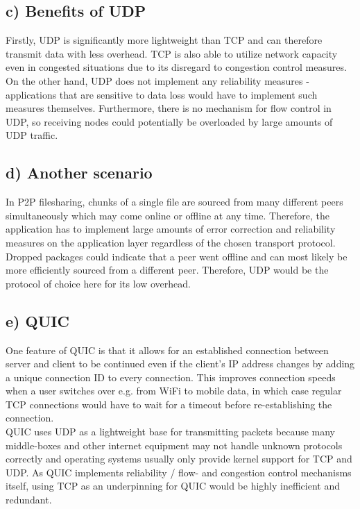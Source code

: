 \documentclass[a4paper, 11 pt, article, accentcolor=tud7b]{tudreport}
\begin{document}
	\subsection*{c) Benefits of UDP}
	Firstly, UDP is significantly more lightweight than TCP and can therefore transmit data with less overhead. TCP is also able to utilize network capacity even in congested situations due to its disregard to congestion control measures. On the other hand, UDP does not implement any reliability measures - applications that are sensitive to data loss would have to implement such measures themselves. Furthermore, there is no mechanism for flow control in UDP, so receiving nodes could potentially be overloaded by large amounts of UDP traffic.
	
	\subsection*{d) Another scenario}
	In P2P filesharing, chunks of a single file are sourced from many different peers simultaneously which may come online or offline at any time. Therefore, the application has to implement large amounts of error correction and reliability measures on the application layer regardless of the chosen transport protocol. Dropped packages could indicate that a peer went offline and can most likely be more efficiently sourced from a different peer. Therefore, UDP would be the protocol of choice here for its low overhead.
	
	\subsection*{e) QUIC}
	One feature of QUIC is that it allows for an established connection between server and client to be continued even if the client's IP address changes by adding a unique connection ID to every connection. This improves connection speeds when a user switches over e.g. from WiFi to mobile data, in which case regular TCP connections would have to wait for a timeout before re-establishing the connection. \\
	QUIC uses UDP as a lightweight base for transmitting packets because many middle-boxes and other internet equipment may not handle unknown protocols correctly and operating systems usually only provide kernel support for TCP and UDP. As QUIC implements reliability / flow- and congestion control mechanisms itself, using TCP as an underpinning for QUIC would be highly inefficient and redundant.
	
\end{document}
